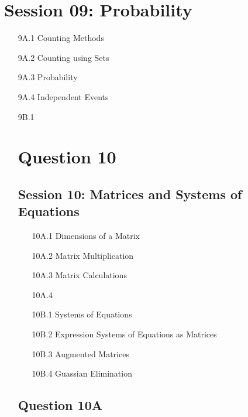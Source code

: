 \section*{Session 09: Probability}
\begin{itemize}
\item[9A.1] Counting Methods
\item[9A.2] Counting using Sets
\item[9A.3] Probability
\item[9A.4] Independent Events
\end{itemize}
\begin{itemize}
\item[9B.1] 












\section*{Question 10}

\subsection*{Session 10: Matrices and Systems of Equations}
\begin{itemize}
\item[10A.1] Dimensions of a Matrix
\item[10A.2] Matrix Multiplication
\item[10A.3] Matrix Calculations
\item[10A.4] 
\end{itemize}

\begin{itemize}
\item[10B.1] Systems of Equations
\item[10B.2] Expression Systems of Equations as Matrices
\item[10B.3] Augmented Matrices
\item[10B.4] Guassian Elimination
\end{itemize}
\subsection*{Question 10A}


\end{itemize}

